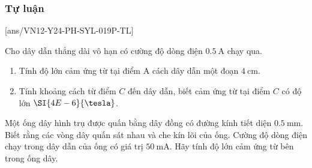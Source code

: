 \subsubsection{Tự luận}
\setcounter{ex}{0}
[ans/VN12-Y24-PH-SYL-019P-TL]
\begin{ex} 
	Cho dây dẫn thẳng dài vô hạn có cường độ dòng điện $\SI{0.5}{\ampere}$ chạy qua.
	\begin{enumerate}[label=\alph*)]
		\item Tính độ lớn cảm ứng từ tại điểm A cách dây dẫn một đoạn $\SI{4}{\centi\meter}$.
		\item Tính khoảng cách từ điểm $C$ đến dây dẫn, biết cảm ứng từ tại điểm $C$ có độ lớn $\SI{4E-6}{\tesla}$.	
	\end{enumerate}
\end{ex}
\begin{ex}
	Một ống dây hình trụ được quấn bằng dây đồng có đường kính tiết diện $\SI{0.5}{\milli\meter}$. Biết rằng các vòng dây quấn sát nhau và che kín lõi của ống. Cường độ dòng điện chạy trong dây dẫn của ống có giá trị $\SI{50}{\milli\ampere}$. Hãy tính độ lớn cảm ứng từ bên trong ống dây.
\end{ex}
